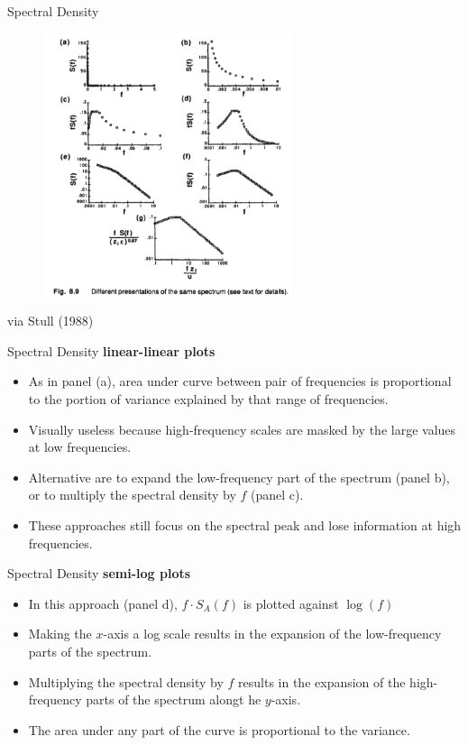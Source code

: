 \begin{frame}{Spectral Density}

	\begin{figure}
	\includegraphics[width=0.65\textwidth]{spectra2.png}	
	\end{figure}
	\centering\tiny via Stull (1988)
\end{frame}
\begin{frame}{Spectral Density}
\textbf{linear-linear plots}
\begin{itemize}
	\item As in panel (a), area under curve between pair of frequencies is proportional to the portion of variance explained by that range of frequencies.
	\item Visually useless because high-frequency scales are masked by the large values at low frequencies.
	\item Alternative are to expand the low-frequency part of the spectrum (panel b), or to multiply the spectral density by $f$ (panel c).
	\item These approaches still focus on the spectral peak and lose information at high frequencies.
\end{itemize}
\end{frame}
\begin{frame}{Spectral Density}
\textbf{semi-log plots}
\begin{itemize}
	\item In this approach (panel d), $f \cdot S_A(f)$ is plotted against $\log(f)$
	\item Making the $x$-axis a log scale results in the expansion of the low-frequency parts of the spectrum.
	\item Multiplying the spectral density by $f$ results in the expansion of the high-frequency parts of the spectrum alongt he $y$-axis.
	\item The area under any part of the curve is proportional to the variance.
\end{itemize}
\end{frame}
